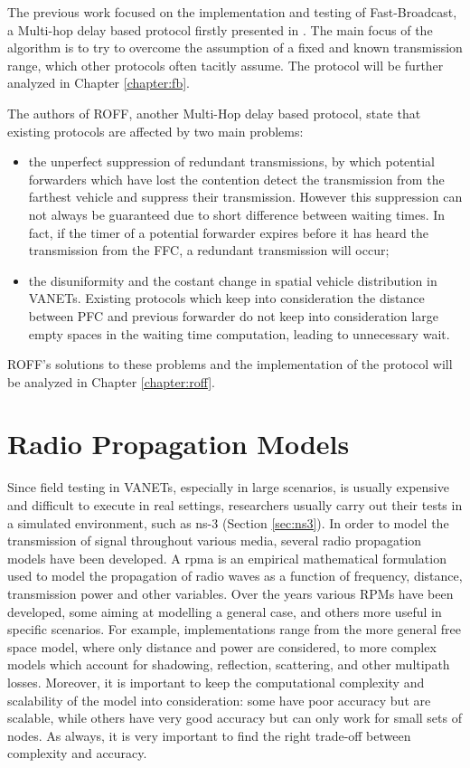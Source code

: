 			
				The previous work\cite{ROM2017} focused on the implementation and testing of Fast-Broadcast, a Multi-hop delay based protocol firstly presented in \cite{4199282}. The main focus of the algorithm is to try to overcome the assumption of a fixed and known transmission range, which other protocols often tacitly assume. The protocol will be further analyzed in Chapter \ref{chapter:fb}.
				
				The authors of ROFF\cite{6906275}, another Multi-Hop delay based protocol, state that existing protocols are affected by two main problems:
				\begin{itemize}
					\item the unperfect suppression of redundant transmissions, by which potential forwarders which have lost the contention detect the transmission from the farthest vehicle and suppress their transmission. However this suppression can not always be guaranteed due to short difference between waiting times. In fact, if the timer of a potential forwarder expires before it has heard the transmission from the FFC, a redundant transmission will occur;
					\item the disuniformity and the costant change in spatial vehicle distribution in VANETs. Existing protocols which keep into consideration the distance between PFC and previous forwarder do not keep into consideration large empty spaces in the waiting time computation, leading to unnecessary wait.
				\end{itemize}
				ROFF's solutions to these problems and the implementation of the protocol will be analyzed in Chapter \ref{chapter:roff}.
	
		\section{Radio Propagation Models}
			\label{sec:rpm}
			Since field testing in VANETs, especially in large scenarios, is usually expensive and difficult to execute in real settings, researchers usually carry out their tests in a simulated environment, such as ns-3 (Section \ref{sec:ns3}). In order to model the transmission of signal throughout various media, several radio propagation models have been developed.
			A \gls{rpma} is an empirical mathematical formulation used to model the propagation of radio waves as a function of frequency, distance, transmission power and other variables. Over the years various RPMs have been developed, some aiming at modelling a general case, and others more useful in specific scenarios. For example, implementations range from the more general free space model, where only distance and power are considered, to more complex models which account for shadowing, reflection, scattering, and other multipath losses. Moreover, it is important to keep the computational complexity and scalability of the model into consideration: some have poor accuracy but are scalable, while others have very good accuracy but can only work for small sets of nodes. As always, it is very important to find the right trade-off between complexity and accuracy.
			
